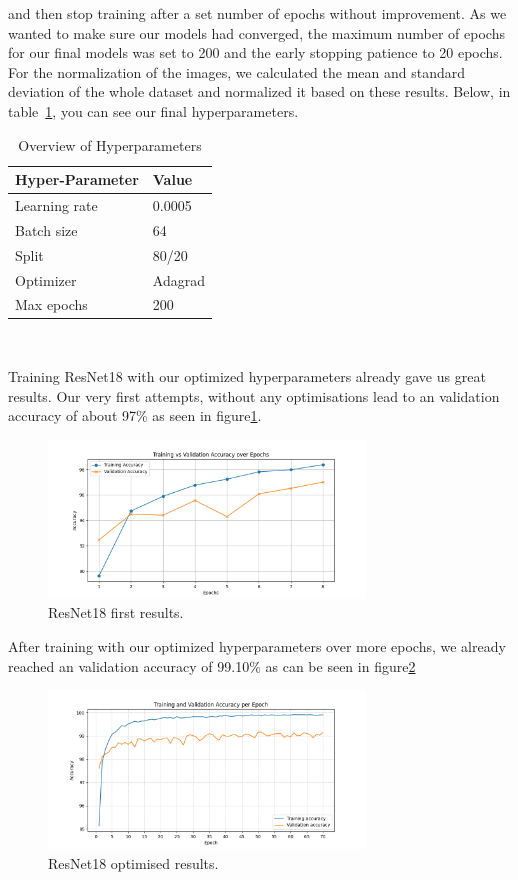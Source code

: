 and then stop training after a set number of epochs without improvement. As we wanted to make sure our models had converged, the maximum number of epochs for our final models was set to 200 and the early stopping patience to 20 epochs. For the normalization of the images, we calculated the mean and standard deviation of the whole dataset and normalized it based on these results. Below, in table~\ref{tab:hyperparameters}, you can see our final hyperparameters. 

\begin{table}[h]
\centering
\begin{tabular}{ll}
\hline
\textbf{Hyper-Parameter} & \textbf{Value} \\
\hline
Learning rate & 0.0005 \\
Batch size & 64 \\
Split & 80/20 \\
Optimizer & Adagrad \\
Max epochs & 200 \\
\hline
\end{tabular}
\caption{Overview of Hyperparameters}~\label{tab:hyperparameters}
\end{table} 


\label{ResNet18}
Training ResNet18 with our optimized hyperparameters already gave us great results. Our very first attempts, without any optimisations lead to an validation accuracy of about 97\% as seen in figure\ref{fig:resNet18first}.
\begin{figure}[ht]
    \centering
    \includegraphics[width=0.75\textwidth]{figures/Resnet18_8_epochs.png}
    \caption{ResNet18 first results.}\label{fig:resNet18first}
\end{figure}

After training with our optimized hyperparameters over more epochs, we already reached an validation accuracy of 99.10\% as can be seen in figure\ref{fig:resNet18opt}

\begin{figure}[ht]
    \centering
    \includegraphics[width=0.75\textwidth]{figures/model_18_v5_accuracy.png}
    \caption{ResNet18 optimised results.}\label{fig:resNet18opt}
\end{figure}

